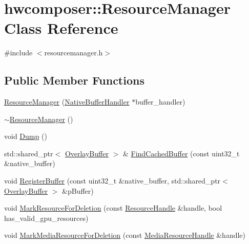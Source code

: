 \hypertarget{classhwcomposer_1_1ResourceManager}{}\section{hwcomposer\+:\+:Resource\+Manager Class Reference}
\label{classhwcomposer_1_1ResourceManager}


{\ttfamily \#include $<$resourcemanager.\+h$>$}

\subsection*{Public Member Functions}
\begin{DoxyCompactItemize}
\item 
\mbox{\hyperlink{classhwcomposer_1_1ResourceManager_aa22da4e56a203700e5b43ec46d670768}{Resource\+Manager}} (\mbox{\hyperlink{classhwcomposer_1_1NativeBufferHandler}{Native\+Buffer\+Handler}} $\ast$buffer\+\_\+handler)
\item 
\mbox{\hyperlink{classhwcomposer_1_1ResourceManager_a2b0726e34c5f2f9e8e832fe0aab5bddf}{$\sim$\+Resource\+Manager}} ()
\item 
void \mbox{\hyperlink{classhwcomposer_1_1ResourceManager_ade81dca6fb55a8e36f07802c6d9153d9}{Dump}} ()
\item 
std\+::shared\+\_\+ptr$<$ \mbox{\hyperlink{classhwcomposer_1_1OverlayBuffer}{Overlay\+Buffer}} $>$ \& \mbox{\hyperlink{classhwcomposer_1_1ResourceManager_a011efc96d68e84a7a093b066078d76bb}{Find\+Cached\+Buffer}} (const uint32\+\_\+t \&native\+\_\+buffer)
\item 
void \mbox{\hyperlink{classhwcomposer_1_1ResourceManager_a7e086990e56fcf24ab2fbc47d677dcce}{Register\+Buffer}} (const uint32\+\_\+t \&native\+\_\+buffer, std\+::shared\+\_\+ptr$<$ \mbox{\hyperlink{classhwcomposer_1_1OverlayBuffer}{Overlay\+Buffer}} $>$ \&p\+Buffer)
\item 
void \mbox{\hyperlink{classhwcomposer_1_1ResourceManager_aed72efa73f3037049b1328ea35f162b3}{Mark\+Resource\+For\+Deletion}} (const \mbox{\hyperlink{namespacehwcomposer_a963c5a1d5902d2d05710dba19af35b48}{Resource\+Handle}} \&handle, bool has\+\_\+valid\+\_\+gpu\+\_\+resources)
\item 
void \mbox{\hyperlink{classhwcomposer_1_1ResourceManager_a0813f1ac50652ca59c3f4b03291dd4b4}{Mark\+Media\+Resource\+For\+Deletion}} (const \mbox{\hyperlink{namespacehwcomposer_aa99e35835961ac7d6baa59a04131ff42}{Media\+Resource\+Handle}} \&handle)
\item 

\end{DoxyCompactItemize}

